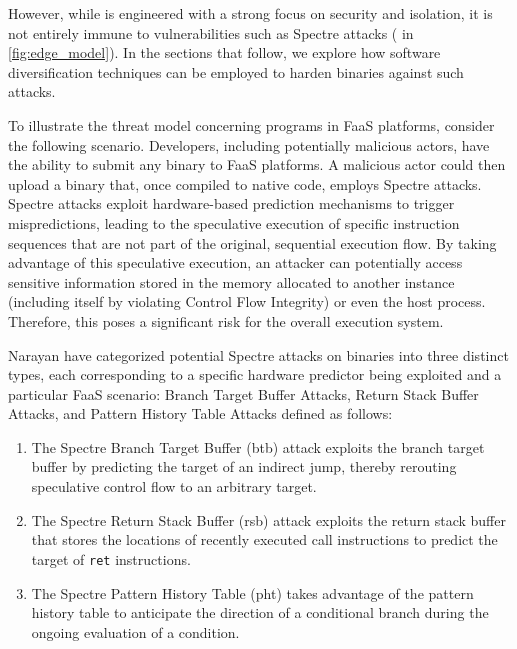 However, while \Wasm is engineered with a strong focus on security and isolation, it is not entirely immune to vulnerabilities such as Spectre attacks \cite{Spectre,Narayan2021Swivel} ( in \autoref{fig:edge_model}). 
In the sections that follow, we explore how software diversification techniques can be employed to harden \Wasm binaries against such attacks.


To illustrate the threat model concerning \Wasm programs in FaaS platforms, consider the following scenario. 
Developers, including potentially malicious actors, have the ability to submit any \Wasm binary to FaaS platforms. 
A malicious actor could then upload a \Wasm binary that, once compiled to native code, employs Spectre attacks.
Spectre attacks exploit hardware-based prediction mechanisms to trigger mispredictions, leading to the speculative execution of specific instruction sequences that are not part of the original, sequential execution flow. 
By taking advantage of this speculative execution, an attacker can potentially access sensitive information stored in the memory allocated to another \Wasm instance (including itself by violating Control Flow Integrity) or even the host process. 
Therefore, this poses a significant risk for the overall execution system.

Narayan \etal \cite{Narayan2021Swivel} have categorized potential Spectre attacks on \Wasm binaries into three distinct types, each corresponding to a specific hardware predictor being exploited and a particular FaaS scenario: Branch Target Buffer Attacks,  Return Stack Buffer Attacks, and Pattern History Table Attacks defined as follows:

\begin{enumerate}
    \item The Spectre Branch Target Buffer (btb) attack exploits the branch target buffer by predicting the target of an indirect jump, thereby rerouting speculative control flow to an arbitrary target.
    \item  The Spectre Return Stack Buffer (rsb) attack exploits the return stack buffer that stores the locations of recently executed call instructions to predict the target of \texttt{ret} instructions.
    \item The Spectre Pattern History Table (pht) takes advantage of the pattern history table to anticipate the direction of a conditional branch during the ongoing evaluation of a condition.
\end{enumerate}


